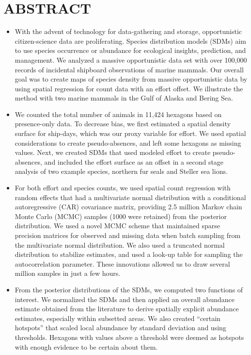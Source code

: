 \documentclass[11pt, titlepage]{article}
\begin{document}
\section*{ABSTRACT}
\thispagestyle{empty}
\begin{onehalfspace}
\begin{itemize}
    \item With the advent of technology for data-gathering and storage, opportunistic citizen-science data are proliferating. Species distribution models (SDMs) aim to use species occurrence or abundance for ecological insights, prediction, and management. We analyzed a massive opportunistic data set with over 100,000 records of incidental shipboard observations of marine mammals. Our overall goal was to create maps of species density from massive opportunistic data by using spatial regression for count data with an effort offset. We illustrate the method with two marine mammals in the Gulf of Alaska and Bering Sea.  
    \item We counted the total number of animals in 11,424 hexagons based on presence-only data. To decrease bias, we first estimated a spatial density surface for ship-days, which was our proxy variable for effort.  We used spatial considerations to create pseudo-absences, and left some hexagons as missing values. Next, we created SDMs that used modeled effort to create pseudo-absences, and included the effort surface as an offset in a second stage analysis of two example species, northern fur seals and Steller sea lions.
    \item For both effort and species counts, we used spatial count regression with random effects that had a multivariate normal distribution with a conditional autoregressive (CAR) covariance matrix, providing 2.5 million Markov chain Monte Carlo (MCMC) samples (1000 were retained) from the posterior distribution. We used a novel MCMC scheme that maintained sparse precision matrices for observed and missing data when batch sampling from the multivariate normal distribution. We also used a truncated normal distribution to stabilize estimates, and used a look-up table for sampling the autocorrelation parameter.  These innovations allowed us to draw several million samples in just a few hours. 
    \item From the posterior distributions of the SDMs, we computed two functions of interest.  We normalized the SDMs and then applied an overall abundance estimate obtained from the literature to derive spatially explicit abundance estimates, especially within subsetted areas.  We also created ``certain hotspots'' that scaled local abundance by standard deviation and using thresholds.  Hexagons with values above a threshold were deemed as hotspots with enough evidence to be certain about them.
\end{itemize}
\end{onehalfspace}
\hrulefill \\
\end{document}
